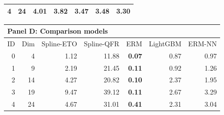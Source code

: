 \begin{table}[htbp]
\begin{tabular}{rrrrrrr}
4 & 24 & 4.01 & 3.82 & 3.47 & 3.48 & 3.30 \\
\bottomrule
\end{tabular}
\par\medskip
\begin{tabular}{rrrrrrr}
\toprule
\multicolumn{7}{l}{\textbf{Panel D: Comparison models}} \\
\midrule
ID & Dim & Spline-ETO & Spline-QFR & ERM & LightGBM & ERM-NN \\
\midrule
0 & 4 & 1.12 & 11.88 & \textbf{0.07} & 0.87 & 0.97 \\
1 & 9 & 2.19 & 21.45 & \textbf{0.11} & 0.92 & 1.26 \\
2 & 14 & 4.27 & 20.82 & \textbf{0.10} & 2.37 & 1.95 \\
3 & 19 & 9.47 & 39.12 & \textbf{0.11} & 2.67 & 3.29 \\
4 & 24 & 4.67 & 31.01 & \textbf{0.41} & 2.31 & 3.04 \\
\bottomrule
\end{tabular}
\end{table}
